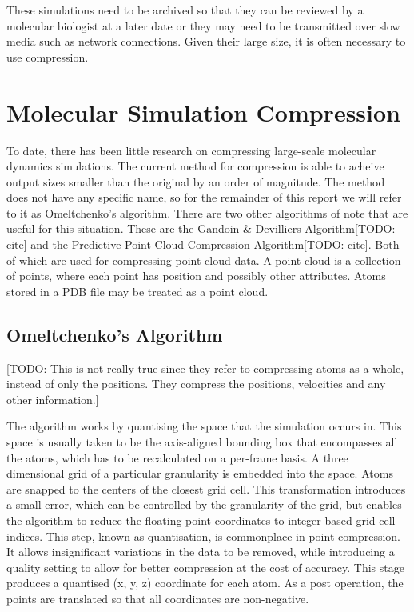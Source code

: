 \documentclass[a4paper,11pt]{report}
\begin{document}
These simulations need to be archived so that they can be reviewed by a molecular biologist at a later date or   they may need to be transmitted over slow media such as network connections. Given their large size, it is often necessary to use compression.

\section{Molecular Simulation Compression}
\label{back_msc}
To date, there has been little research on compressing large-scale molecular dynamics simulations. The current method\cite{RefWorks:3} for compression is able to acheive output sizes smaller than the original by an order of magnitude. The method does not have any specific name, so for the remainder of this report we will refer to it as Omeltchenko's algorithm. There are two other algorithms of note that are useful for this situation. These are the Gandoin \& Devilliers Algorithm[TODO: cite] and the Predictive Point Cloud Compression Algorithm[TODO: cite]. Both of which are used for compressing point cloud data. A point cloud is a collection of points, where each point has position and possibly other attributes. Atoms stored in a PDB file may be treated as a point cloud.

\subsection{Omeltchenko's Algorithm}


[TODO: This is not really true since they refer to compressing atoms as a whole, instead of only the positions. They compress the positions, velocities and any other information.]

The algorithm works by quantising the space that the simulation occurs in. This space is usually taken to be the axis-aligned bounding box that encompasses all the atoms, which has to be recalculated on a per-frame basis. A three dimensional grid of a particular granularity is embedded into the space. Atoms are snapped to the centers of the closest grid cell. This transformation introduces a small error, which can be controlled by the granularity of the grid, but enables the algorithm to reduce the floating point coordinates to integer-based grid cell indices. This step, known as quantisation, is commonplace in point compression. It allows insignificant variations in the data to be removed, while introducing a quality setting to allow for better compression at the cost of accuracy. This stage produces a quantised (x, y, z) coordinate for each atom. As a post operation, the points are translated so that all coordinates are non-negative.
\end{document}
